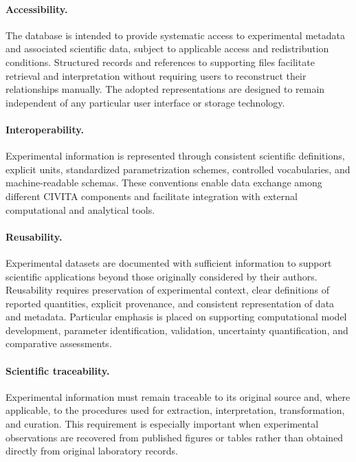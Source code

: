 \paragraph{Accessibility.}

The database is intended to provide systematic access to
experimental metadata and associated scientific data,
subject to applicable access and redistribution conditions.
Structured records and references to supporting files
facilitate retrieval and interpretation without requiring
users to reconstruct their relationships manually.
The adopted representations are designed to remain
independent of any particular user interface or
storage technology.

\paragraph{Interoperability.}

Experimental information is represented through consistent
scientific definitions, explicit units, standardized
parametrization schemes, controlled vocabularies, and
machine-readable schemas. These conventions enable data
exchange among different CIVITA components and facilitate
integration with external computational and analytical tools.

\paragraph{Reusability.}

Experimental datasets are documented with sufficient
information to support scientific applications beyond
those originally considered by their authors. Reusability
requires preservation of experimental context, clear
definitions of reported quantities, explicit provenance,
and consistent representation of data and metadata.
Particular emphasis is placed on supporting computational
model development, parameter identification, validation,
uncertainty quantification, and comparative assessments.

\paragraph{Scientific traceability.}

Experimental information must remain traceable to its
original source and, where applicable, to the procedures
used for extraction, interpretation, transformation,
and curation. This requirement is especially important
when experimental observations are recovered from
published figures or tables rather than obtained
directly from original laboratory records.

